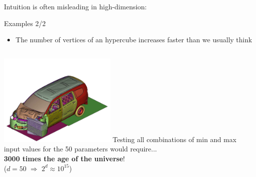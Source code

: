 \documentclass{beamer}
\begin{document}
\begin{frame}{}
Intuition is often misleading in high-dimension:
\begin{exampleblock}{Examples 2/2}
\begin{itemize}
	\item The number of vertices of an hypercube increases faster than we usually think
\end{itemize}
\begin{columns}[c]
\column{5.5cm}
\includegraphics[height=4.5cm]{figures/image15}
\column{5cm}
Testing all combinations of min and max input values for the 50 parameters would require... \pause \\

\textbf{3000 times the age of the universe}!\\
($d=50$ $\Rightarrow$ $2^d \approx 10^{15}$)
\end{columns}
\end{exampleblock}
\end{frame}
\end{document}
